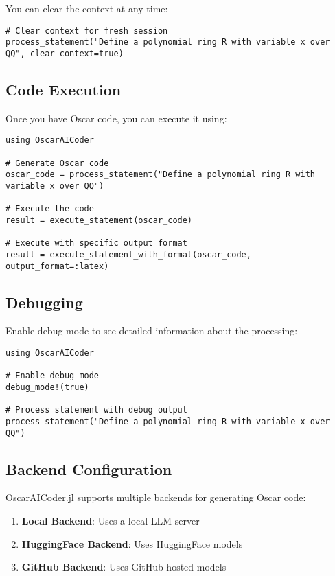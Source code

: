 \documentclass[11pt,a4paper]{article}
\begin{document}
You can clear the context at any time:

\begin{lstlisting}
# Clear context for fresh session
process_statement("Define a polynomial ring R with variable x over QQ", clear_context=true)
\end{lstlisting}

\subsection{Code Execution}

Once you have Oscar code, you can execute it using:

\begin{lstlisting}
using OscarAICoder

# Generate Oscar code
oscar_code = process_statement("Define a polynomial ring R with variable x over QQ")

# Execute the code
result = execute_statement(oscar_code)

# Execute with specific output format
result = execute_statement_with_format(oscar_code, output_format=:latex)
\end{lstlisting}

\subsection{Debugging}

Enable debug mode to see detailed information about the processing:

\begin{lstlisting}
using OscarAICoder

# Enable debug mode
debug_mode!(true)

# Process statement with debug output
process_statement("Define a polynomial ring R with variable x over QQ")
\end{lstlisting}

\subsection{Backend Configuration}

OscarAICoder.jl supports multiple backends for generating Oscar code:

\begin{enumerate}
    \item \textbf{Local Backend}: Uses a local LLM server
    \item \textbf{HuggingFace Backend}: Uses HuggingFace models
    \item \textbf{GitHub Backend}: Uses GitHub-hosted models
\end{enumerate}
\end{document}
